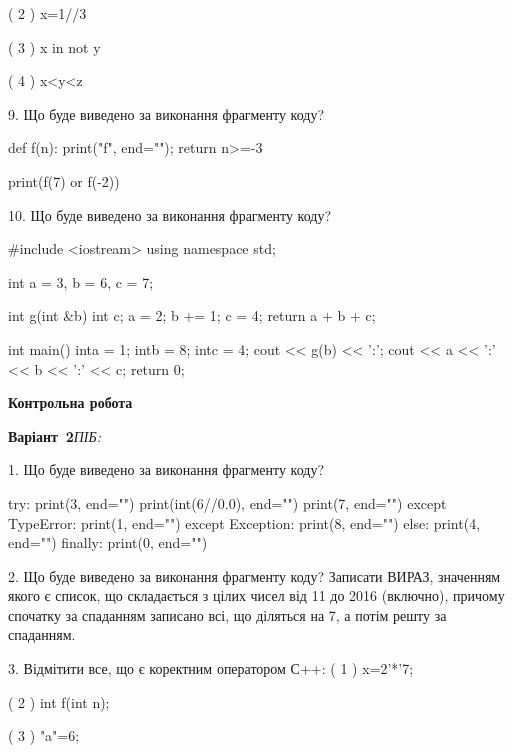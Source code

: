 \documentclass[11pt]{article}
\begin{document}
( 2 ) x=1//3

( 3 ) x in not y

( 4 ) x<y<z

9. Що буде виведено за виконання фрагменту коду?

def f(n):
    print("f", end="");
    return n>=-3

print(f(7) or f(-2))

10. Що буде виведено за виконання фрагменту коду?

#include <iostream>
using namespace std;

int a = 3, b = 6, c = 7;

int g(int &b){
int c;    a = 2;
    b += 1;
    c = 4;
    return a + b + c;
}

int main(){
    inta = 1;
    intb = 8;
    intc = 4;
    cout << g(b) << ':';
    cout << a << ':' << b << ':' << c;
    return 0; 
}











\newpage

\newpage

{\large\textbf{Контрольна робота}}

\textbf{Варіант \No\,2}\hfill \textit{ПІБ:}\,\underline{\hspace{60mm}}
\vspace{4mm}

1. Що буде виведено за виконання фрагменту коду?

try:
    print(3, end="")
    print(int(6//0.0), end="")
    print(7, end="")
except TypeError: 
    print(1, end="")
except Exception: 
    print(8, end="")
else:
    print(4, end="")
finally:
    print(0, end="")


2. Що буде виведено за виконання фрагменту коду?
Записати ВИРАЗ, значенням якого є список, що складається з цілих чисел від 11 до 2016 (включно), причому спочатку за спаданням записано всі, що діляться на 7, а потім решту за спаданням.

3. %
Відмітити все, що є коректним оператором С++:
( 1 ) x=2'*'7;

( 2 ) int f(int n);

( 3 ) "a"=6;
\end{document}
